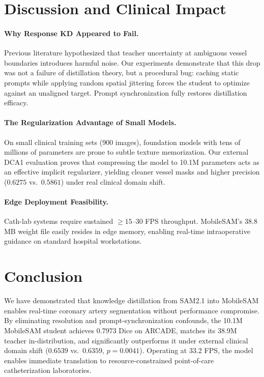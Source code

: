 \documentclass[10pt,twocolumn]{article}
\begin{document}
\section{Discussion and Clinical Impact}

\paragraph{Why Response KD Appeared to Fail.}
Previous literature hypothesized that teacher uncertainty at ambiguous vessel boundaries introduces harmful noise. Our experiments demonstrate that this drop was not a failure of distillation theory, but a procedural bug: caching static prompts while applying random spatial jittering forces the student to optimize against an unaligned target. Prompt synchronization fully restores distillation efficacy.

\paragraph{The Regularization Advantage of Small Models.}
On small clinical training sets (900 images), foundation models with tens of millions of parameters are prone to subtle texture memorization. Our external DCA1 evaluation proves that compressing the model to 10.1M parameters acts as an effective implicit regularizer, yielding cleaner vessel masks and higher precision ($0.6275$ vs.\ $0.5861$) under real clinical domain shift.

\paragraph{Edge Deployment Feasibility.}
Cath-lab systems require sustained $\ge 15$--$30$ FPS throughput. MobileSAM's 38.8\,MB weight file easily resides in edge memory, enabling real-time intraoperative guidance on standard hospital workstations.

\section{Conclusion}

We have demonstrated that knowledge distillation from SAM2.1 into MobileSAM enables real-time coronary artery segmentation without performance compromise. By eliminating resolution and prompt-synchronization confounds, the 10.1M MobileSAM student achieves $0.7973$ Dice on ARCADE, matches its 38.9M teacher in-distribution, and significantly outperforms it under external clinical domain shift ($0.6539$ vs.\ $0.6359$, $p=0.0041$). Operating at 33.2 FPS, the model enables immediate translation to resource-constrained point-of-care catheterization laboratories.


\end{document}
